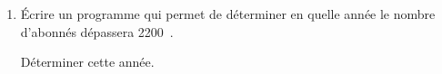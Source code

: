 \documentclass[10pt]{article}
\providecommand{\np}[2][]{{#2~#1}}
\begin{document}
\begin{enumerate}
\begin{enumerate}
\[u_n = - \np{1500} \times  0,9^n + \np{2500}.\]
		\item Déterminer la limite de la suite $\left(u_n\right)$ et interpréter dans le contexte de l'exercice.
	\end{enumerate}
\item Écrire un programme qui permet de déterminer en quelle année le nombre d'abonnés dépassera \np{2200}.

Déterminer cette année.
\end{enumerate}

\bigskip
\end{document}
